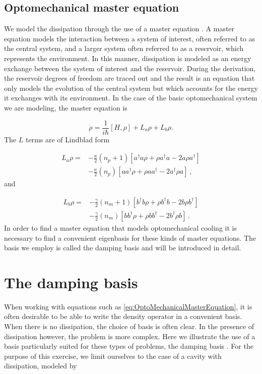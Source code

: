 \documentclass[12pt]{article}
\begin{document}
\subsection{Optomechanical master equation}

We model the dissipation through the use of a master equation \cite{CarmichaelQuantumOptics1999}. A master equation models the interaction between a system of interest, often referred to as the central system, and a larger system often referred to as a reservoir, which represents the environment. In this manner, dissipation is modeled as an energy exchange between the system of interest and the reservoir. During the derivation, the reservoir degrees of freedom are traced out and the result is an equation that only models the evolution of the central system but which accounts for the energy it exchanges with its environment. In the case of the basic optomechanical system we are modeling, the master equation is

\begin{equation} \label{eq:OptoMechanicalMasterEquation}
\dot{\rho} = \frac{1}{i\hbar}[H,\rho] +L_a\rho + L_b \rho.
\end{equation} The $L$ terms are of Lindblad form 

\begin{align}
L_a \rho =& - \frac{\kappa}{2}(n_p + 1)[a^\dagger a\rho + \rho a^\dagger a -2a\rho a^\dagger]  \\
 &- \frac{\kappa}{2}(n_p)[ aa^\dagger\rho + \rho  aa^\dagger -2a^\dagger\rho a]\, ,\nonumber
\end{align} and

\begin{align}
L_b \rho =& - \frac{\gamma}{2}(n_m + 1)[b^\dagger b\rho + \rho b^\dagger b -2b\rho b^\dagger]  \\
 &- \frac{\gamma}{2}(n_m)[ bb^\dagger\rho + \rho  bb^\dagger -2b^\dagger\rho b]\, .\nonumber
\end{align} In order to find a master equation that models optomechanical cooling it is necessary to find a convenient eigenbasis for these kinds of master equations. The basis we employ is called the damping basis and will be introduced in detail. 

\section{The damping basis}

When working with equations such as \ref{eq:OptoMechanicalMasterEquation}, it is often desirable to be able to write the density operator in a convenient basis. When there is no dissipation, the choice of basis is often clear. In the presence of dissipation however, the problem is more complex. Here we illustrate the use of a basis particularly suited for these types of problems, the damping basis \cite{BriegelDampingBasis1993}. For the purpose of this exercise, we limit ourselves to the case of a cavity with dissipation, modeled by
\end{document}
